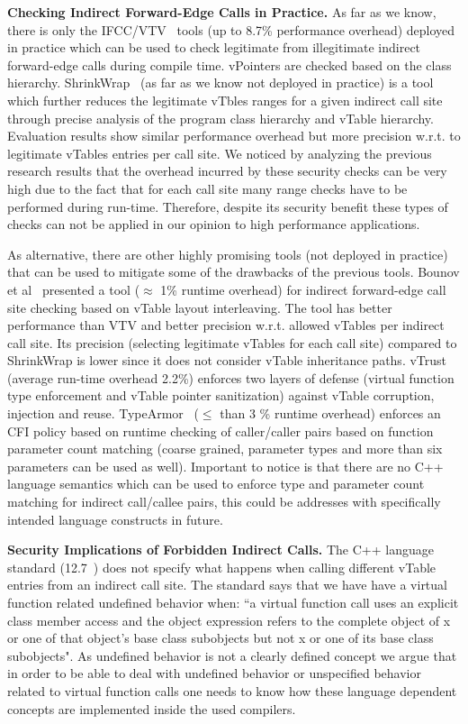 \textbf{Checking Indirect Forward-Edge Calls in Practice.}
\label{C++ Indirect Calls in Practice}
As far as we know, there is only the IFCC/VTV~\cite{vtv:tice} tools (up to 8.7\% performance overhead) deployed in practice
which can be used to check legitimate from illegitimate indirect forward-edge calls during compile time.
vPointers are checked based on the class hierarchy. ShrinkWrap~\cite{haller:shrinkwrap} (as far as we know not deployed in practice)
is a tool which further reduces the legitimate vTbles ranges for a given indirect call site
through precise analysis of the program class hierarchy and vTable hierarchy. 
Evaluation results show similar performance overhead but more precision w.r.t. to legitimate vTables entries per call site.
We noticed by analyzing the previous research results that the overhead incurred by
these security checks can be very high due to the fact that for each call site many range checks 
have to be performed during run-time. Therefore, despite its security benefit these types of
checks can not be applied in our opinion to high performance applications.

As alternative, there are other highly promising tools (not deployed in practice) that can be used to mitigate 
some of the drawbacks of the previous tools. 
Bounov et al~\cite{bounov:interleaving} presented a tool ($\approx$ 1\% runtime overhead)
for indirect forward-edge call site checking based on vTable layout interleaving. The tool has better performance
than VTV and better precision w.r.t. allowed vTables per indirect call site. Its precision (selecting legitimate vTables for each call site)
compared to ShrinkWrap is lower since it does not consider vTable inheritance paths.
vTrust~\cite{zhang:vtrust} (average run-time overhead 2.2\%) enforces two layers of defense (virtual function type enforcement and vTable pointer sanitization)
against vTable corruption, injection and reuse.
TypeArmor~\cite{veen:typearmor} ($\le$ than 3 \% runtime overhead) enforces an CFI policy based on runtime checking of caller/caller pairs based
on function parameter count matching (coarse grained, parameter types and more than six parameters can be used as well).
Important to notice is that there are no C++ language semantics which can be used to enforce type and 
parameter count matching for indirect call/callee pairs, this could be addresses with specifically intended language constructs in future.

\textbf{Security Implications of Forbidden Indirect Calls.}
\label{Security Implications of Forbidden Forward Indirect Calls}
The C++ language standard (12.7~\cite{iso:iecN3690}) does not specify
what happens when calling different vTable entries from an indirect call site.
The standard says that we have have a virtual function related undefined behavior when:
``a virtual function call uses an explicit class member access and the object expression refers to the complete
object of x or one of that object’s base class subobjects but not x or one of its base class subobjects".
As undefined behavior is not a clearly defined concept we argue that in order to be able to deal
with undefined behavior or  unspecified behavior related to virtual function calls one needs to know
how these language dependent concepts are implemented inside the used compilers.

